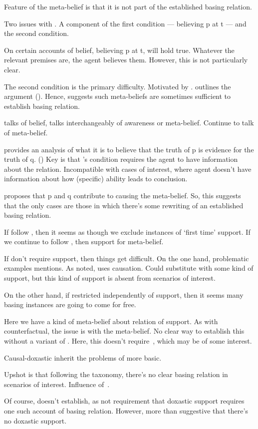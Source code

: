 \begin{note}[Doxastic]
    Feature of the meta-belief is that it is not part of the established basing relation.

    Two issues with \citeauthor{Tolliver:1982us}.
    A component of the first condition --- believing p at t --- and the second condition.

    On certain accounts of belief, believing p at t, will hold true.
    Whatever the relevant premises are, the agent believes them.
    However, this is not particularly clear.

    The second condition is the primary difficulty.
    Motivated by \citeauthor{Lehrer:1971aa}.
    \cite{Korcz:2000uo} outlines the argument (\citeyear[534]{Korcz:2000uo}).
    Hence, suggests such meta-beliefs are sometimes sufficient to establish basing relation.

    \citeauthor{Tolliver:1982us} talks of belief, \citeauthor{Korcz:2000uo} talks interchangeably of awareness or meta-belief.
    Continue to talk of meta-belief.

    \citeauthor{Tolliver:1982us} provides an analysis of what it is to believe that the truth of p is evidence for the truth of q. (\citeyear[156--157]{Tolliver:1982us})
    Key is that \citeauthor{Tolliver:1982us}'s condition requires the agent to have information about the relation.
    Incompatible with cases of interest, where agent doesn't have information about how (specific) ability leads to conclusion.

    \citeauthor{Korcz:2000uo} proposes that p and q contribute to causing the meta-belief.
    So, this suggests that the only cases are those in which there's some rewriting of an established basing relation.

    If follow \citeauthor{Korcz:2000uo}, then it seems as though we exclude instances of `first time' support.
    If we continue to follow \citeauthor{Tolliver:1982us}, then support for meta-belief.

    If don't require support, then things get difficult.
    On the one hand, problematic examples \citeauthor{Korcz:2000uo} mentions.
    As noted, \citeauthor{Korcz:2000uo} uses causation.
    Could substitute with some kind of support, but this kind of support is absent from scenarios of interest.

    On the other hand, if restricted independently of support, then it seems many basing instances are going to come for free.


  Here we have a kind of meta-belief about relation of support.
  As with counterfactual, the issue is with the meta-belief.
  No clear way to establish this without a variant of \AR{}.
  Here, this doesn't require~\ESU{}, which may be of some interest.

  Causal-doxastic inherit the problems of more basic.

  Upshot is that following the taxonomy, there's no clear basing relation in scenarios of interest.
  Influence of~\ESU{}.

  Of course, doesn't establish, as not requirement that doxastic support requires one such account of basing relation.
  However, more than suggestive that there's no doxastic support.
\end{note}

